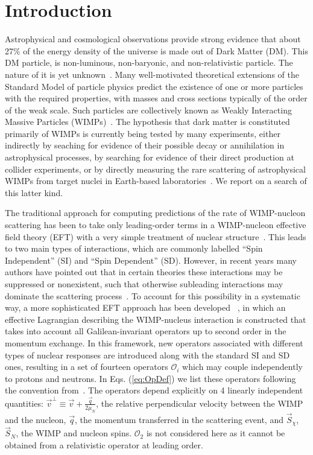 \section{Introduction}

Astrophysical and cosmological observations provide strong evidence that about 27\% of the energy density of the universe is made out of Dark Matter (DM). This DM particle, is non-luminous, non-baryonic, and non-relativistic particle. The nature of it is yet unknown~\cite{Harvey1462,WMAP:9years,PLANCK}. Many well-motivated theoretical extensions of the Standard Model of particle physics predict the existence of one or more particles with the required properties, with masses and cross sections typically of the order of the weak scale. Such particles are collectively known as Weakly Interacting Massive Particles (WIMPs)~\cite{Bertone:2010zza}. The hypothesis that dark matter is constituted primarily of WIMPs is currently being tested by many experiments, either indirectly by seaching for evidence of their possible decay or annihilation in astrophysical processes, by searching for evidence of their direct production at collider experiments, or by directly measuring the rare scattering of astrophysical WIMPs from target nuclei in Earth-based laboratories~\cite{xe100_run_combination,PANDAX,LUXnew,COGENT,CDMSlite,CREST,DAMA}. We report on a search of this latter kind.


The traditional approach for computing predictions of the rate of WIMP-nucleon scattering has been to take only leading-order terms in a WIMP-nucleon effective field theory (EFT) with a very simple treatment of nuclear structure~\cite{LEWIN}. This leads to two main types of interactions, which are commonly labelled ``Spin Independent'' (SI) and ``Spin Dependent'' (SD). However, in recent years many authors have pointed out that in certain theories these interactions may be suppressed or nonexistent, such that otherwise subleading interactions may dominate the scattering process~\cite{Chang:2009yt}. To account for this possibility in a systematic way, a more sophisticated EFT approach has been developed ~\cite{Fitzpatrick:2012ib,Anand:MathTools,Fitzpatrick:MathTools}, in which an effective Lagrangian describing the WIMP-nucleus interaction is constructed that takes into account all Galilean-invariant operators up to second order in the momentum exchange. In this framework, new operators associated with different types of nuclear responses are introduced along with the standard SI and SD ones, resulting in a set of fourteen operators $\mathcal{O}_i$ which may couple independently to protons and neutrons. In Eqs. (\ref{eq:OpDef}) we list these operators following the convention from~\cite{Anand:MathTools}. The operators depend explicitly on 4 linearly independent quantities: $\vec{v}^{\perp} \equiv \vec{v} + \frac{\vec{q}}{2\mu_N} $, the relative perpendicular velocity between the WIMP and the nucleon, $\vec{q}$, the momentum transferred in the scattering event, and $\vec{S}_\chi$, $\vec{S}_N$, the WIMP and nucleon spins. $\mathcal{O}_2$ is not considered here as it cannot be obtained from a relativistic operator at leading order.
%

